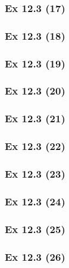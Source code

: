 \subsubsection{Ex 12.3 (17)}\label{sec:Ex_12.3.17}

\subsubsection{Ex 12.3 (18)}\label{sec:Ex_12.3.18}

\subsubsection{Ex 12.3 (19)}\label{sec:Ex_12.3.19}

\subsubsection{Ex 12.3 (20)}\label{sec:Ex_12.3.20}

\newpage		%

\subsubsection{Ex 12.3 (21)}\label{sec:Ex_12.3.21}

\subsubsection{Ex 12.3 (22)}\label{sec:Ex_12.3.22}

\subsubsection{Ex 12.3 (23)}\label{sec:Ex_12.3.23}

\subsubsection{Ex 12.3 (24)}\label{sec:Ex_12.3.24}

\subsubsection{Ex 12.3 (25)}\label{sec:Ex_12.3.25}

\subsubsection{Ex 12.3 (26)}\label{sec:Ex_12.3.26}

